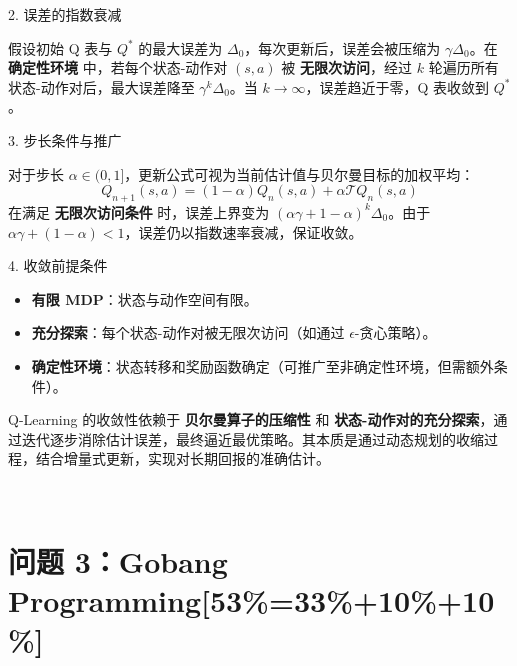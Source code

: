 \documentclass{article}
\begin{document}
\begin{enumerate}[label=(\alph*), start=1]
    2. 误差的指数衰减
    
    假设初始 Q 表与 \( Q^* \) 的最大误差为 \(\Delta_0\)，每次更新后，误差会被压缩为 \(\gamma \Delta_0\)。在 \textbf{确定性环境} 中，若每个状态-动作对 \((s, a)\) 被 \textbf{无限次访问}，经过 \( k \) 轮遍历所有状态-动作对后，最大误差降至 \(\gamma^k \Delta_0\)。当 \( k \to \infty \)，误差趋近于零，Q 表收敛到 \( Q^* \)。
    	
    3. 步长条件与推广
    	
    对于步长 \(\alpha \in (0, 1]\)，更新公式可视为当前估计值与贝尔曼目标的加权平均：
    \[Q_{n+1}(s, a) = (1-\alpha) Q_n(s, a) + \alpha \mathcal{T} Q_n(s, a)\]
    在满足 \textbf{无限次访问条件} 时，误差上界变为 \((\alpha \gamma + 1 - \alpha)^k \Delta_0\)。由于 \(\alpha \gamma + (1 - \alpha) < 1\)，误差仍以指数速率衰减，保证收敛。
    	
    4. 收敛前提条件
    \begin{itemize}
  		\item \textbf{有限 MDP}：状态与动作空间有限。
   		\item \textbf{充分探索}：每个状态-动作对被无限次访问（如通过 \(\epsilon\)-贪心策略）。
   		\item \textbf{确定性环境}：状态转移和奖励函数确定（可推广至非确定性环境，但需额外条件）。    
   	\end{itemize}
    	
    Q-Learning 的收敛性依赖于 \textbf{贝尔曼算子的压缩性} 和 \textbf{状态-动作对的充分探索}，通过迭代逐步消除估计误差，最终逼近最优策略。其本质是通过动态规划的收缩过程，结合增量式更新，实现对长期回报的准确估计。
    
    
\end{enumerate}
\

\section{问题 3：Gobang Programming[53\%=33\%+10\%+10\%]}
\end{document}
